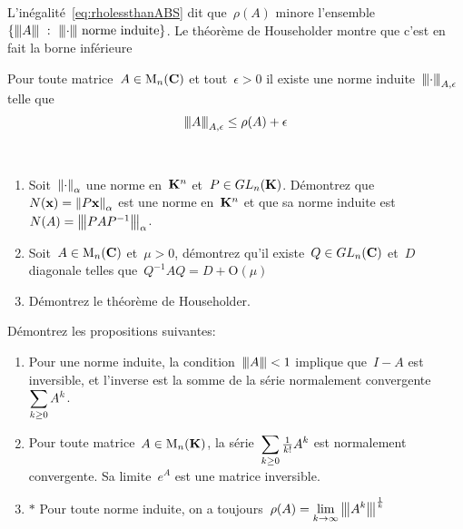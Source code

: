 
L'inégalité~\ref{eq:rholessthanABS} dit que~$\rho(A)$ minore
l'ensemble~$\left\{\ABS A\ :\ \ABS\cdot\ \textrm{norme induite}\right\}$.  Le
théorème de Householder montre que c'est en fait la borne inférieure

\begin{theorem}[Householder]
	Pour toute matrice~$A\in\mathrm{M}_n(\mathbf{C})$ et tout~$\epsilon>0$ il existe une norme
	induite~${\left\vert\kern-0.25ex\left\vert\kern-0.25ex\left\vert \cdot \right\vert\kern-0.25ex\right\vert\kern-0.25ex\right\vert}_{A,\epsilon}$ telle que
	\begin{equation}\label{eq:rholessthanABS}
		{\left\vert\kern-0.25ex\left\vert\kern-0.25ex\left\vert A \right\vert\kern-0.25ex\right\vert\kern-0.25ex\right\vert}_{A,\epsilon}\le\rho(A)+\epsilon
	\end{equation}
\end{theorem}

\begin{exercice}$ $
	\begin{enumerate}
		\item Soit~$\left\|\cdot\right\|_\alpha$ une norme en~$\mathbf{K}^n$ et~$P\in GL_n(\mathbf{K})$.
			Démontrez que~$N(\mathbf{x})=\left\|P\mathbf{x}\right\|_\alpha$ est une norme en~$\mathbf{K}^n$ et que
			sa norme induite est~$N(A)={\left\vert\kern-0.25ex\left\vert\kern-0.25ex\left\vert PAP^{-1} \right\vert\kern-0.25ex\right\vert\kern-0.25ex\right\vert}_\alpha$.
		\item Soit~$A\in\mathrm{M}_n(\mathbf{C})$ et~$\mu>0$, démontrez qu'il existe~$Q\in
			GL_n(\mathbf{C})$ et~$D$ diagonale telles que~$Q^{-1}AQ=D+\mathrm{O}(\mu)$
		\item Démontrez le théorème de Householder.
	\end{enumerate}
\end{exercice}



\begin{exercice}
	Démontrez les propositions suivantes:
	\begin{enumerate}
		\item Pour une norme induite, la condition~${\left\vert\kern-0.25ex\left\vert\kern-0.25ex\left\vert A \right\vert\kern-0.25ex\right\vert\kern-0.25ex\right\vert}<1$ implique que~$I-A$
			est inversible, et l'inverse est la somme de la série
			normalement convergente~$\displaystyle\sum_{k\ge0}A^k$.
		\item Pour toute matrice~$A\in\mathrm{M}_n(\mathbf{K})$, la
			série~$\displaystyle\sum_{k\ge0}\tfrac1{k!}A^k$ est normalement convergente.
			Sa limite~$e^A$ est une matrice inversible.
		\item $*$ Pour toute norme induite, on a
			toujours~$\displaystyle\rho(A)=\lim_{k\to\infty}{\left\vert\kern-0.25ex\left\vert\kern-0.25ex\left\vert A^k \right\vert\kern-0.25ex\right\vert\kern-0.25ex\right\vert}^{\frac1k}$
	\end{enumerate}
\end{exercice}


